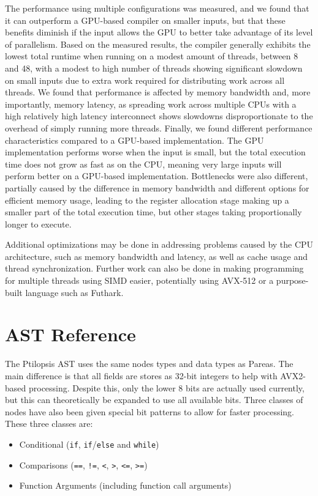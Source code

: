 \documentclass[11pt,dvipsnames]{article}
\newcommand{\icpp}[1]{\texttt{#1}}
\newcommand{\mono}[1]{\texttt{#1}}
\begin{document}
The performance using multiple configurations was measured, and we found that it can outperform a GPU-based compiler on smaller inputs, but that these benefits diminish if the input allows the GPU to better take advantage of its level of parallelism. Based on the measured results, the compiler generally exhibits the lowest total runtime when running on a modest amount of threads, between 8 and 48, with a modest to high number of threads showing significant slowdown on small inputs due to extra work required for distributing work across all threads. We found that performance is affected by memory bandwidth and, more importantly, memory latency, as spreading work across multiple CPUs with a high relatively high latency interconnect shows slowdowns disproportionate to the overhead of simply running more threads. Finally, we found different performance characteristics compared to a GPU-based implementation. The GPU implementation performs worse when the input is small, but the total execution time does not grow as fast as on the CPU, meaning very large inputs will perform better on a GPU-based implementation. Bottlenecks were also different, partially caused by the difference in memory bandwidth and different options for efficient memory usage, leading to the register allocation stage making up a smaller part of the total execution time, but other stages taking proportionally longer to execute.

Additional optimizations may be done in addressing problems caused by the CPU architecture, such as memory bandwidth and latency, as well as cache usage and thread synchronization. Further work can also be done in making programming for multiple threads using SIMD easier, potentially using AVX-512 or a purpose-built language such as Futhark. 




\appendix

\section{AST Reference} \label{ast}
The Ptilopsis AST uses the same nodes types and data types as Pareas. The main difference is that all fields are stores as 32-bit integers to help with AVX2-based processing. Despite this, only the lower 8 bits are actually used currently, but this can theoretically be expanded to use all available bits. Three classes of nodes have also been given special bit patterns to allow for faster processing. These three classes are:
\begin{itemize}
    \item Conditional (\icpp{if}, \icpp{if}/\icpp{else} and \icpp{while})
    \item Comparisons (\mono{==}, \mono{!=}, \mono{<}, \mono{>}, \mono{<=}, \mono{>=})
    \item Function Arguments (including function call arguments)
\end{itemize}
\end{document}
